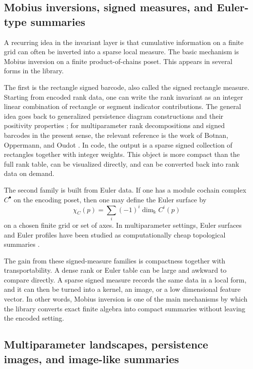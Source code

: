 \documentclass[11pt]{article}
\newcommand{\kk}{\Bbbk}
\theoremstyle{definition}
\theoremstyle{remark}
\begin{document}
\subsection{Mobius inversions, signed measures, and Euler-type summaries}

A recurring idea in the invariant layer is that cumulative information on a finite grid can often be inverted into a sparse local measure.  The basic mechanism is Mobius inversion on a finite product-of-chains poset.  This appears in several forms in the library.

The first is the rectangle signed barcode, also called the signed rectangle measure.  Starting from encoded rank data, one can write the rank invariant as an integer linear combination of rectangle or segment indicator contributions.  The general idea goes back to generalized persistence diagram constructions and their positivity properties \cite{Pat18}; for multiparameter rank decompositions and signed barcodes in the present sense, the relevant reference is the work of Botnan, Oppermann, and Oudot \cite{BOO22}.  In code, the output is a sparse signed collection of rectangles together with integer weights.  This object is more compact than the full rank table, can be visualized directly, and can be converted back into rank data on demand.

The second family is built from Euler data.  If one has a module cochain complex $C^\bullet$ on the encoding poset, then one may define the Euler surface by
\[
\chi_C(p)=\sum_i (-1)^i \dim_{\kk} C^i(p)
\]
on a chosen finite grid or set of axes.  In multiparameter settings, Euler surfaces and Euler profiles have been studied as computationally cheap topological summaries \cite{Bel22,DG23}.

The gain from these signed-measure families is compactness together with transportability.  A dense rank or Euler table can be large and awkward to compare directly.  A sparse signed measure records the same data in a local form, and it can then be turned into a kernel, an image, or a low dimensional feature vector.  In other words, Mobius inversion is one of the main mechanisms by which the library converts exact finite algebra into compact summaries without leaving the encoded setting.

\subsection{Multiparameter landscapes, persistence images, and image-like summaries}
\end{document}
